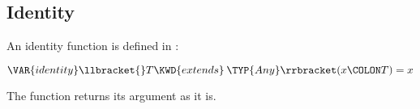 %
%
%
%

\subsection{Identity}

An identity function  is defined in \library:
\begin{Fortress}
\(\VAR{identity}\llbracket{}T \KWD{extends}\mskip 4mu plus 4mu\TYP{Any}\rrbracket(x\COLON T) = x\)
\end{Fortress}
The function returns its argument as it is.
